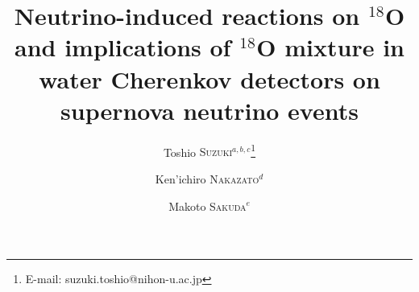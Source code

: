 \documentclass[preprint,12pt]{elsarticle}
\begin{document}
\begin{frontmatter}



\title{Neutrino-induced reactions on $^{18}$O and implications of $^{18}$O mixture in water Cherenkov detectors on supernova neutrino events}


\author{Toshio \textsc{Suzuki$^{a,b,c}$}\footnote{E-mail: suzuki.toshio@nihon-u.ac.jp}}
\author{Ken'ichiro \textsc{Nakazato$^{d}$}}
\author{Makoto \textsc{Sakuda$^{e}$}}

\address[]{Department of Physics, College of Humanities and Sciences, Nihon University, Setagaya-ku, Tokyo 156-8550, Japan}
\address[]{NAT Research Center,3129-45 Hibara Muramatsu, Tokai-mura, Naka-gun, Ibaraki 319-1112, Japan}
\address[]{School of Physics, Beihang University, 37 Xueyuan Road, Haidian-qu, Beijing 100083, People’s Republic of China}
\address[]{Faculty of Arts and Science, Kyushu University, Fukuoka 819-0395, Japan}
\address[]{Physics Department, Okayama University, Okayama 700-8530, Japan}



\end{frontmatter}
\end{document}
